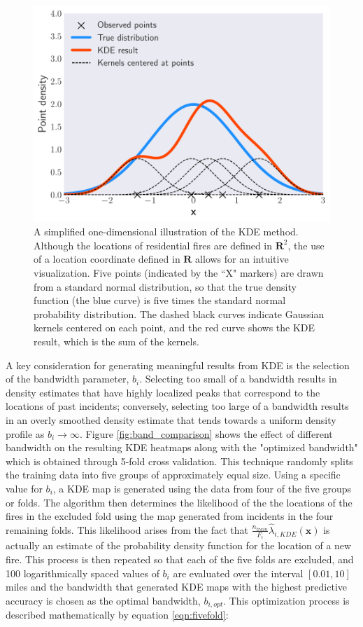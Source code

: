 \documentclass{svjour3}
\begin{document}
\begin{figure}[htb] \centering
\includegraphics[width=.5\textwidth]{./figures/1dkde.pdf}
\caption{A simplified one-dimensional illustration of the KDE method. Although the locations of residential fires are defined in $\textbf{R}^2$, the use of a location coordinate defined in $\textbf{R}$ allows for an intuitive visualization. Five points (indicated by the ``X" markers) are drawn from a standard normal distribution, so that the true density function (the blue curve) is five times the standard normal probability distribution. The dashed black curves indicate Gaussian kernels centered on each point, and the red curve shows the KDE result, which is the sum of the kernels.}
\label{fig:1dkde}
\end{figure}

A key consideration for generating meaningful results from KDE is the selection of the bandwidth parameter, $b_i$. Selecting too small of a bandwidth results in density estimates that have highly localized peaks that correspond to the locations of past incidents; conversely, selecting too large of a bandwidth results in an overly smoothed density estimate that tends towards a uniform density profile as $b_i \rightarrow  \infty$. Figure \ref{fig:band_comparison} shows the effect of different bandwidth on the resulting KDE heatmaps along with the "optimized bandwidth" which is obtained through 5-fold cross validation. This technique randomly splits the training data into five groups of approximately equal size. Using a specific value for $b_i$, a KDE map is generated using the data from four of the five groups or folds. The algorithm then determines the likelihood of the the locations of the fires in the excluded fold using the map generated from incidents in the four remaining folds. This likelihood arises from the fact that $\frac{n_{train}}{F_i}\hat\lambda_{i,KDE}(\textbf{x})$ is actually an estimate of the probability density function for the location of a new fire. This process is then repeated so that each of the five folds are excluded, and 100 logarithmically spaced values of $b_i$ are evaluated over the interval $[0.01,10]$ miles and the bandwidth that generated KDE maps with the highest predictive accuracy is chosen as the optimal bandwidth, $b_{i,opt}$. This optimization process is described mathematically by equation \ref{eqn:fivefold}:
\end{document}
